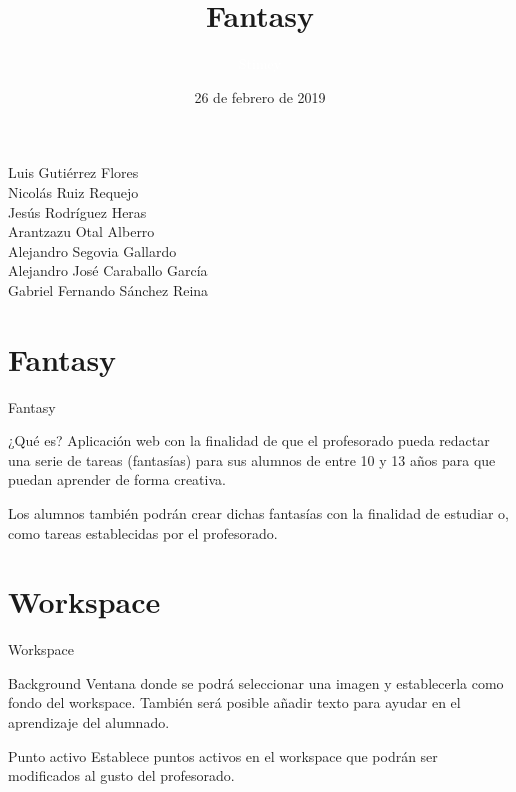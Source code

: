 \documentclass{beamer}
\title{Fantasy}
\author{\textcolor{white}{Stimey}}
\date{26 de febrero de 2019}
\begin{document}
\begin{frame}
  \titlepage
  \begin{center}
  Luis Gutiérrez Flores\\
Nicolás Ruiz Requejo\\
Jesús Rodríguez Heras\\
Arantzazu Otal Alberro\\
Alejandro Segovia Gallardo\\
Alejandro José Caraballo García\\
Gabriel Fernando Sánchez Reina	
  \end{center}
  
\end{frame}


\section{Fantasy}
\begin{frame}{Fantasy}
\begin{block}{¿Qué es?}
	Aplicación web con la finalidad de que el profesorado pueda redactar una serie de tareas (fantasías) para sus alumnos de entre 10 y 13 años para que puedan aprender de forma creativa.
	
	Los alumnos también podrán crear dichas fantasías con la finalidad de estudiar o, como tareas establecidas por el profesorado.
\end{block}
\end{frame}

\section{Workspace}
\begin{frame}{Workspace}
\begin{block}{Background}
	Ventana donde se podrá seleccionar una imagen y establecerla como fondo del workspace. También será posible añadir texto para ayudar en el aprendizaje del alumnado.
\end{block}
\begin{block}{Punto activo}
	Establece puntos activos en el workspace que podrán ser modificados al gusto del profesorado.
\end{block}
\end{frame}
\end{document}
